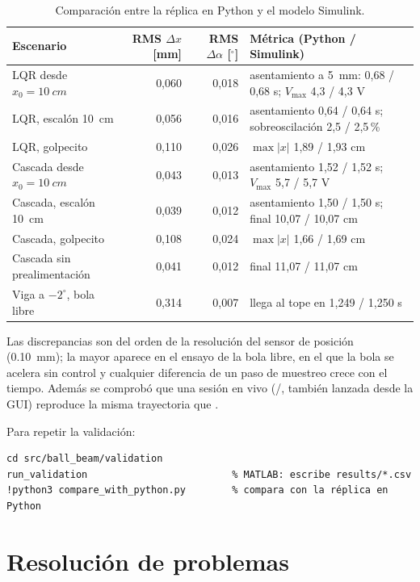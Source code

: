 \begin{table}[H]
\centering\small
\begin{tabularx}{\linewidth}{@{}lrrX@{}}
\toprule
Escenario & RMS $\Delta x$ [mm] & RMS $\Delta\alpha$ [$^\circ$] & Métrica (Python / Simulink)\\
\midrule
LQR desde $x_0=\SI{10}{cm}$ & 0,060 & 0,018 & asentamiento a \SI{5}{mm}: 0,68 / 0,68 s; $V_{\max}$ 4,3 / 4,3 V\\
LQR, escalón \SI{10}{cm} & 0,056 & 0,016 & asentamiento 0,64 / 0,64 s; sobreoscilación 2,5 / 2,5\,\%\\
LQR, golpecito & 0,110 & 0,026 & $\max|x|$ 1,89 / 1,93 cm\\
Cascada desde $x_0=\SI{10}{cm}$ & 0,043 & 0,013 & asentamiento 1,52 / 1,52 s; $V_{\max}$ 5,7 / 5,7 V\\
Cascada, escalón \SI{10}{cm} & 0,039 & 0,012 & asentamiento 1,50 / 1,50 s; final 10,07 / 10,07 cm\\
Cascada, golpecito & 0,108 & 0,024 & $\max|x|$ 1,66 / 1,69 cm\\
Cascada sin prealimentación & 0,041 & 0,012 & final 11,07 / 11,07 cm\\
Viga a $-2^\circ$, bola libre & 0,314 & 0,007 & llega al tope en 1,249 / 1,250 s\\
\bottomrule
\end{tabularx}
\caption{Comparación entre la réplica en Python y el modelo Simulink.}
\label{tab:validacion}
\end{table}

Las discrepancias son del orden de la resolución del sensor de posición (\SI{0.10}{mm}); la mayor aparece en el ensayo de la bola libre, en el que la bola se acelera sin control y cualquier diferencia de un paso de muestreo crece con el tiempo. Además se comprobó que una sesión en vivo (/, también lanzada desde la GUI) reproduce la misma trayectoria que .

Para repetir la validación:
\begin{lstlisting}
cd src/ball_beam/validation
run_validation                         % MATLAB: escribe results/*.csv
!python3 compare_with_python.py        % compara con la réplica en Python
\end{lstlisting}

\chapter{Resolución de problemas}

